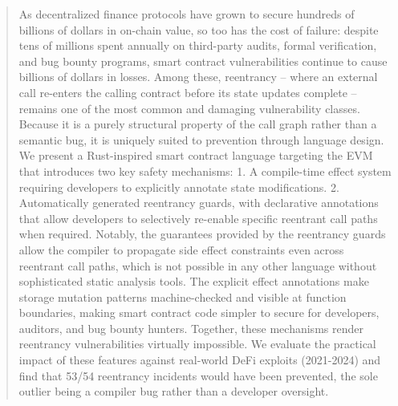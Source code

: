 \begin{abstract}
As decentralized finance protocols have grown to secure hundreds of billions of dollars in on-chain value, so too has the cost of failure: despite tens of millions spent annually on third-party audits, formal verification, and bug bounty programs, smart contract vulnerabilities continue to cause billions of dollars in losses. Among these, reentrancy -- where an external call re-enters the calling contract before its state updates complete -- remains one of the most common and damaging vulnerability classes. Because it is a purely structural property of the call graph rather than a semantic bug, it is uniquely suited to prevention through language design. We present a Rust-inspired smart contract language targeting the EVM that introduces two key safety mechanisms:
1. A compile-time effect system requiring developers to explicitly annotate state modifications.
2. Automatically generated reentrancy guards, with declarative annotations that allow developers to selectively re-enable specific reentrant call paths when required.
Notably, the guarantees provided by the reentrancy guards allow the compiler to propagate side effect constraints even across reentrant call paths, which is not possible in any other language without sophisticated static analysis tools. The explicit effect annotations make storage mutation patterns machine-checked and visible at function boundaries, making smart contract code simpler to secure for developers, auditors, and bug bounty hunters. Together, these mechanisms render reentrancy vulnerabilities virtually impossible. We evaluate the practical impact of these features against real-world DeFi exploits (2021-2024) and find that 53/54 reentrancy incidents would have been prevented, the sole outlier being a compiler bug rather than a developer oversight.
\end{abstract}